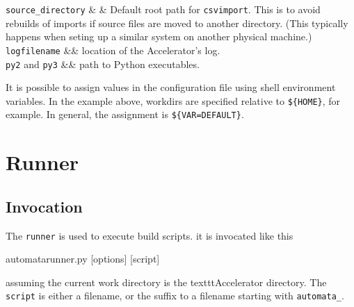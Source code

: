 \RP \texttt{source\_directory} & & Default root path for
\texttt{csvimport}.  This is to avoid rebuilds of imports if source
files are moved to another directory.  (This typically happens when
seting up a similar system on another physical machine.)\\

\RP \texttt{logfilename} && location of the Accelerator's log.\\

\RP \texttt{py2} and \texttt{py3} && path to Python executables.
\\

\stoptable
{}

It is possible to assign values in the configuration file using shell
environment variables.  In the example above, workdirs are specified
relative to \texttt{\$\{HOME\}}, for example.  In general, the
assignment is \texttt{\$\{VAR=DEFAULT\}}.



\clearpage
\section{Runner}

\subsection{Invocation}
The \texttt{runner} is used to execute build scripts.  it is invocated
like this
\begin{shell}
automatarunner.py [options] [script]
\end{shell}
assuming the current work directory is the texttt{Accelerator}
directory.  The \texttt{script} is either a filename, or the suffix to
a filename starting with \texttt{automata\_}.

